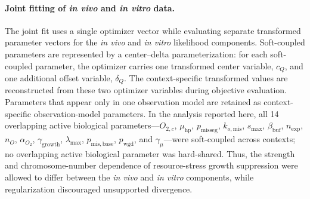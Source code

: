 \documentclass[11pt]{article}
\begin{document}
\paragraph{Joint fitting of \textit{in vivo} and \textit{in vitro} data.}
The joint fit uses a single optimizer vector while evaluating separate transformed parameter vectors for the \textit{in vivo} and \textit{in vitro} likelihood components. Soft-coupled parameters are represented by a center--delta parameterization: for each soft-coupled parameter, the optimizer carries one transformed center variable, $c_Q$, and one additional offset variable, $\delta_Q$. The context-specific transformed values are reconstructed from these two optimizer variables during objective evaluation.
Parameters that appear only in one observation model are retained as context-specific observation-model parameters. In the analysis reported here, all 14 overlapping active biological parameters---$O_{2,c}$, $\mu_{\mathrm{hp}}$, $p_{\mathrm{misseg}}$, $k_{o,\mathrm{mis}}$, $s_{\max}$, $\beta_{\mathrm{buf}}$, $n_{\mathrm{exp}}$, $n_O$, $\alpha_{O_2}$, $\gamma_{\mathrm{growth}}$, $\lambda_{\max}$, $p_{\mathrm{mis,base}}$, $p_{\mathrm{wgd}}$, and $\gamma_\mu$---were soft-coupled across contexts; no overlapping active biological parameter was hard-shared. Thus, the strength and chromosome-number dependence of resource-stress growth suppression were allowed to differ between the \textit{in vivo} and \textit{in vitro} components, while regularization discouraged unsupported divergence.
\end{document}
